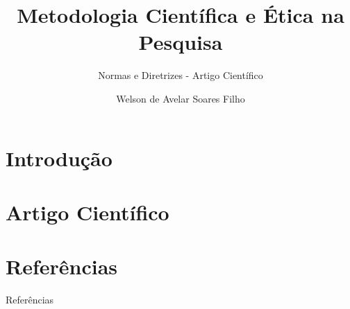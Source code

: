 \documentclass[11pt]{beamer}
\title{Metodologia Científica e Ética na Pesquisa}
\subtitle{Normas e Diretrizes - Artigo Científico}
\author{Welson de Avelar Soares Filho}
\begin{document}


\section{Introdução}


\section{Artigo Científico}


%

%

%

%

%

%



\section{Referências}
\nocite{*}
\begin{frame}[allowframebreaks]{Referências}
    
    
\end{frame}


\begin{frame}
\titlepage 
\end{frame}
\end{document}
